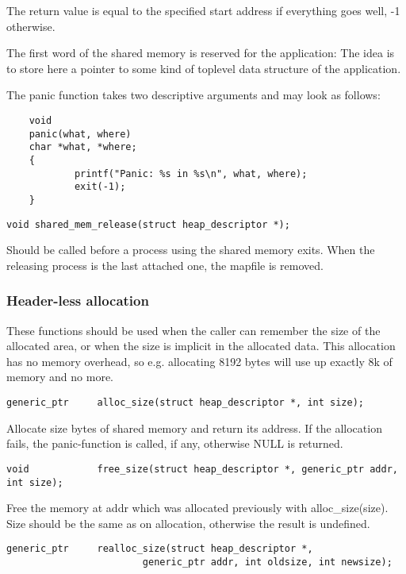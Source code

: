     The return value is equal to the specified start address if everything
    goes well, -1 otherwise.

    The first word of the shared memory is reserved for the application:
    The idea is to store here a pointer to some kind of toplevel data
    structure of the application.

    The panic function takes two descriptive arguments and may look
    as follows:

\begin{verbatim}
    void
    panic(what, where)
    char *what, *where;
    {
            printf("Panic: %s in %s\n", what, where);
            exit(-1);
    }
\end{verbatim}


\begin{verbatim}
void shared_mem_release(struct heap_descriptor *);
\end{verbatim}

    Should be called before a process using the shared memory exits.
    When the releasing process is the last attached one, the mapfile
    is removed.


\subsubsection{Header-less allocation}

These functions should be used when the caller can remember the size of the
allocated area, or when the size is implicit in the allocated data.
This allocation has no memory overhead, so e.g. allocating 8192 bytes
will use up exactly 8k of memory and no more.

\begin{verbatim}
generic_ptr     alloc_size(struct heap_descriptor *, int size);
\end{verbatim}

    Allocate size bytes of shared memory and return its address.
    If the allocation fails, the panic-function is called, if any,
    otherwise NULL is returned.

\begin{verbatim}
void            free_size(struct heap_descriptor *, generic_ptr addr, int size);
\end{verbatim}

    Free the memory at addr which was allocated previously with
    alloc_size(size). Size should be the same as on allocation,
    otherwise the result is undefined.

\begin{verbatim}
generic_ptr     realloc_size(struct heap_descriptor *,
                        generic_ptr addr, int oldsize, int newsize);
\end{verbatim}

